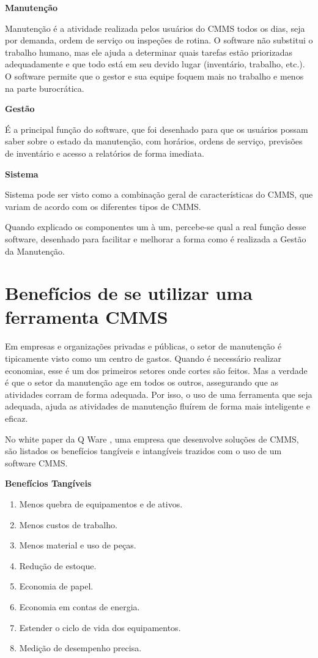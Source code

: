 \textbf{Manutenção}

Manutenção é a atividade realizada pelos usuários do CMMS todos os dias, seja por demanda, ordem de serviço ou inspeções de rotina. O software não substitui o trabalho humano, mas ele ajuda a determinar quais tarefas estão priorizadas adequadamente e que todo está em seu devido lugar (inventário, trabalho, etc.). O software permite que o gestor e sua equipe foquem mais no trabalho e menos na parte burocrática. 

\textbf{Gestão}

É a principal função do software, que foi desenhado para que os usuários possam saber sobre o estado da manutenção, com horários, ordens de serviço, previsões de inventário e acesso a relatórios de forma imediata. 

\textbf{Sistema}

Sistema pode ser visto como a combinação geral de características do CMMS, que variam de acordo com os diferentes tipos de CMMS.

Quando explicado os componentes um à um, percebe-se qual a real função desse software, desenhado para facilitar e melhorar a forma como é realizada a Gestão da Manutenção. 

\section{Benefícios de se utilizar uma ferramenta CMMS}

Em empresas e organizações privadas e públicas, o setor de manutenção é tipicamente visto como um centro de gastos. Quando é necessário realizar economias, esse é um dos primeiros setores onde cortes são feitos. Mas a verdade é que o setor da manutenção age em todos os outros, assegurando que as atividades corram de forma adequada. Por isso, o uso de uma ferramenta que seja adequada, ajuda as atividades de manutenção fluírem de forma mais inteligente e eficaz.

No white paper da Q Ware \cite{qware}, uma empresa que desenvolve soluções de CMMS, são listados os benefícios tangíveis e intangíveis trazidos com o uso de um software CMMS.

\textbf{Benefícios Tangíveis}

\begin{enumerate}
	\item Menos quebra de equipamentos e de ativos.
	\item Menos custos de trabalho.
	\item Menos material e uso de peças.
	\item Redução de estoque.
	\item Economia de papel.
	\item Economia em contas de energia.
	\item Estender o ciclo de vida dos equipamentos.
	\item Medição de desempenho precisa.
\end{enumerate}

